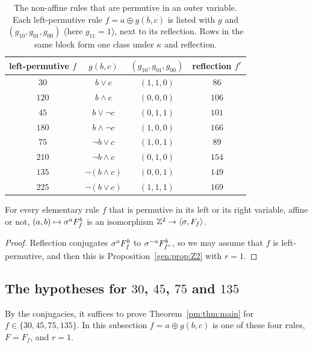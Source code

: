 \begin{table}[ht]
\caption{The non-affine rules that are permutive in an outer variable. Each left-permutive rule $f=a\oplus g(b,c)$ is listed with $g$ and $(g_{10},g_{01},g_{00})$ (here $g_{11}=1$), next to its reflection. Rows in the same block form one class under $\kappa$ and reflection.}
\label{pm:tab:classes}
\centering
\begin{tabular}{cccc}
\toprule
left-permutive $f$ & $g(b,c)$ & $(g_{10},g_{01},g_{00})$ & reflection $f^r$\\
\midrule
$30$ & $b\vee c$ & $(1,1,0)$ & $86$\\
$120$ & $b\wedge c$ & $(0,0,0)$ & $106$\\
\midrule
$45$ & $b\vee\neg c$ & $(0,1,1)$ & $101$\\
$180$ & $b\wedge\neg c$ & $(1,0,0)$ & $166$\\
\midrule
$75$ & $\neg b\vee c$ & $(1,0,1)$ & $89$\\
$210$ & $\neg b\wedge c$ & $(0,1,0)$ & $154$\\
\midrule
$135$ & $\neg(b\wedge c)$ & $(0,0,1)$ & $149$\\
$225$ & $\neg(b\vee c)$ & $(1,1,1)$ & $169$\\
\bottomrule
\end{tabular}
\end{table}

\begin{proposition}\label{pm:prop:Z2}
For every elementary rule $f$ that is permutive in its left or its right variable, affine or not, $(a,b)\mapsto\sigma^aF_f^b$ is an isomorphism $\mathbb{Z}^2\to\langle\sigma,F_f\rangle$.
\end{proposition}

\begin{proof}
Reflection conjugates $\sigma^aF_f^b$ to $\sigma^{-a}F_{f^r}^b$, so we may assume that $f$ is left-permutive, and then this is Proposition~\ref{gen:prop:Z2} with $r=1$.
\end{proof}

\subsection{The hypotheses for \texorpdfstring{$30$, $45$, $75$ and $135$}{30, 45, 75 and 135}}\label{pm:sec:audit}

By the conjugacies, it suffices to prove Theorem~\ref{pm:thm:main} for $f\in\{30,45,75,135\}$. In this subsection $f=a\oplus g(b,c)$ is one of these four rules, $F=F_f$, and $r=1$.

